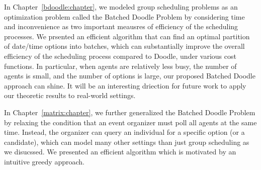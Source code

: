 \label{discussion:chapter}

In Chapter~\ref{bdoodle:chapter}, we modeled group scheduling problems as an optimization problem called the Batched Doodle Problem by considering time and inconvenience as two important meausres of efficiency of the scheduling processes. We prsented an efficient algorithm that can find an optimal partition of date/time options into batches, which can substantially improve the overall efficiency of the scheduling process compared to Doodle, under various cost functions. In particular, when agents are relatively less busy, the number of agents is small, and the number of options is large, our proposed Batched Doodle approach can shine. It will be an interesting driection for future work to apply our theoretic results to real-world settings.

In Chapter~\ref{matrix:chapter}, we further generalized the Batched Doodle Problem by relaxing the condition that an event organizer must poll all agents at the same time. Instead, the organizer can query an individual for a specific option (or a candidate), which can model many other settings than just group scheduling as we disucssed. We presented an efficient algorithm which is motivated by an intuitive greedy approach. 